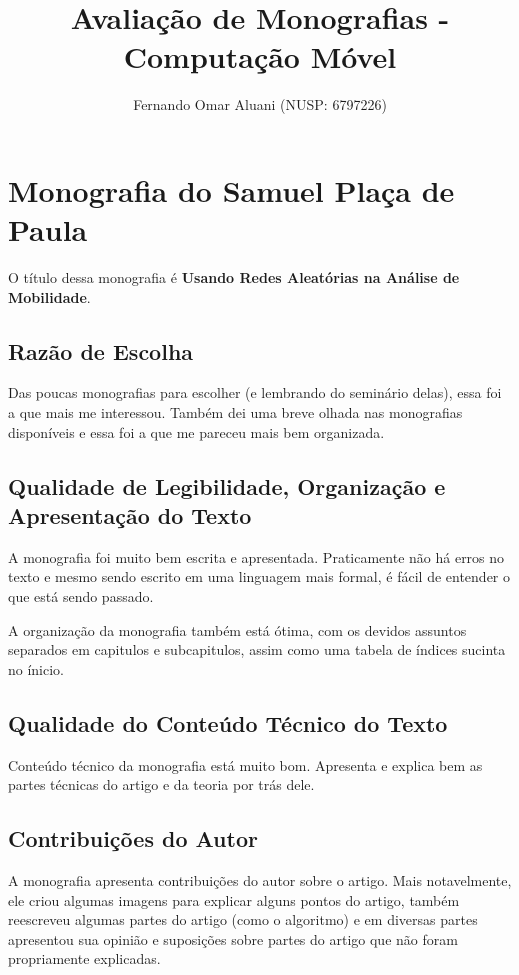 \documentclass[a4paper,11pt]{article}
\title{Avaliação de Monografias - Computação Móvel}
\author{Fernando Omar Aluani (NUSP: 6797226)}
\begin{document}
\maketitle

\section{Monografia do Samuel Plaça de Paula}
O título dessa monografia é \textbf{Usando Redes Aleatórias na Análise de Mobilidade}.

\subsection{Razão de Escolha}
Das poucas monografias para escolher (e lembrando do seminário delas), essa foi a que mais me interessou.
Também dei uma breve olhada nas monografias disponíveis e essa foi a que me pareceu mais bem organizada.

\subsection{Qualidade de Legibilidade, Organização e Apresentação do Texto}
A monografia foi muito bem escrita e apresentada. Praticamente não há erros no texto e mesmo sendo
escrito em uma linguagem mais formal, é fácil de entender o que está sendo passado.

A organização da monografia também está ótima, com os devidos assuntos separados em capitulos e
subcapitulos, assim como uma tabela de índices sucinta no ínicio.

\subsection{Qualidade do Conteúdo Técnico do Texto}
Conteúdo técnico da monografia está muito bom. Apresenta e explica bem as partes técnicas do artigo
e da teoria por trás dele.

\subsection{Contribuições do Autor} %
A monografia apresenta contribuições do autor sobre o artigo. Mais notavelmente, ele criou algumas
imagens para explicar alguns pontos do artigo, também reescreveu algumas partes do artigo (como o algoritmo)
e em diversas partes apresentou sua opinião e suposições sobre partes do artigo que não foram propriamente
explicadas.
\end{document}
